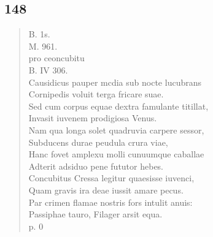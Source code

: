 \documentclass[11pt, a4paper]{report}
\begin{document}
            \subsection*{148}
      \begin{verse}
      B. 1s. \\ M. 961. \\ pro ceoncubitu \\ B. IV 306. \\ Causidicus pauper mcdia sub nocte lucubrans \\ Cornipedis voluit terga fricare suae. \\ Sed cum corpus equae dextra famulante titillat, \\ Invasit iuvenem prodigiosa Venus. \\ Nam qua longa solet quadruvia carpere sessor, \\ Subducens durae peudula crura viae, \\ Hanc fovet amplexu molli cunuumque caballae \\ Adterit adsiduo pene fututor hebes. \\ Concubitus Cressa legitur quaesisse iuvenci, \\ Quam gravis ira deae iussit amare pecus. \\ Par crimen flamae nostris fors intulit anuis: \\ Passiphae tauro, Filager arsit equa. \\ p. 0 \\ 
      \end{verse}
  
\end{document}
